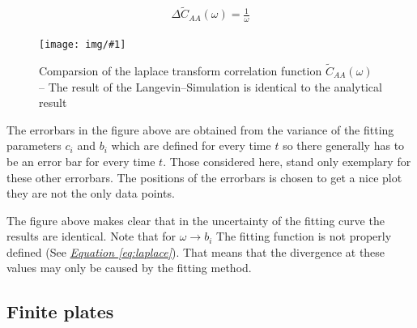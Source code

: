 \documentclass[a4paper, parskip=half]{scrartcl}
\newcommand{\myImage}[2]{
	\begin{figure}[H]
	\centering
	\texttt{[image: img/\#1]}
	\caption{#2}
	\label{pic:#1}
	\end{figure}
}
\newcommand{\myEqRef}[1]{\textit{\hyperref[eq:#1]{Equation \ref*{eq:#1}}}}
\begin{document}
\begin{align}
\Delta\widetilde{C}_{AA}(\omega) = \frac{1}{\omega}
\end{align}

\myImage{compare_lac}{Comparsion of the laplace transform correlation function $\widetilde{C}_{AA}(\omega)$ -- The result of the Langevin--Simulation is identical to the analytical result}

The errorbars in the figure above are obtained from the variance of the fitting parameters $c_i$ and $b_i$ which are defined for every time $t$ so there generally has to be an error bar for every time $t$. Those considered here, stand only exemplary for these other errorbars. The positions of the errorbars is chosen to get a nice plot they are not the only data points. 

The figure above makes clear that in the uncertainty of the fitting curve the results are identical. Note that for $\omega \rightarrow b_i$ The fitting function is not properly defined (See \myEqRef{laplace}). That means that the divergence at these values may only be caused by the fitting method.

\newpage
\subsection{Finite plates}
\end{document}

